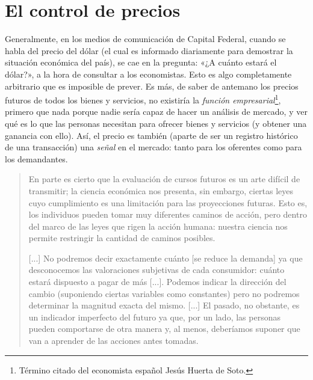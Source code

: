 \documentclass[12pt,a4paper,twoside]{book}
\begin{document}
\section{El control de precios}
Generalmente, en los medios de comunicación de Capital Federal, cuando se habla del precio del dólar (el cual es informado diariamente para demostrar la situación económica del país), se cae en la pregunta: «¿A cuánto estará el dólar?», a la hora de consultar a los economistas. Esto es algo completamente arbitrario que es imposible de prever. Es más, de saber de antemano los precios futuros de todos los bienes y servicios, no existiría la \textit{función empresarial}\footnote{Término citado del economista español Jesús Huerta de Soto.}, primero que nada porque nadie sería capaz de hacer un análisis de mercado, y ver qué es lo que las personas necesitan para ofrecer bienes y servicios (y obtener una ganancia con ello). Así, el precio es también (aparte de ser un registro histórico de una transacción) una \textit{señal} en el mercado: tanto para los oferentes como para los demandantes.

\begin{quotation}
En parte es cierto que la evaluación de cursos futuros es un arte difícil de transmitir; la ciencia económica nos presenta, sin embargo, ciertas leyes cuyo cumplimiento es una limitación para las proyecciones futuras. Esto es, los individuos pueden tomar muy diferentes caminos de acción, pero dentro del marco de las leyes que rigen la acción humana: nuestra ciencia nos permite restringir la cantidad de caminos posibles.

[...] No podremos decir exactamente cuánto [se reduce la demanda] ya que desconocemos las valoraciones subjetivas de cada consumidor: cuánto estará dispuesto a pagar de más [...]. Podemos indicar la dirección del cambio (suponiendo ciertas variables como constantes) pero no podremos determinar la magnitud exacta del mismo. [...] El pasado, no obstante, es un indicador imperfecto del futuro ya que, por un lado, las personas pueden comportarse de otra manera y, al menos, deberíamos suponer que van a aprender de las acciones antes tomadas. \cite[pág. 35]{elementos-econopol}
\end{quotation}
\end{document}
